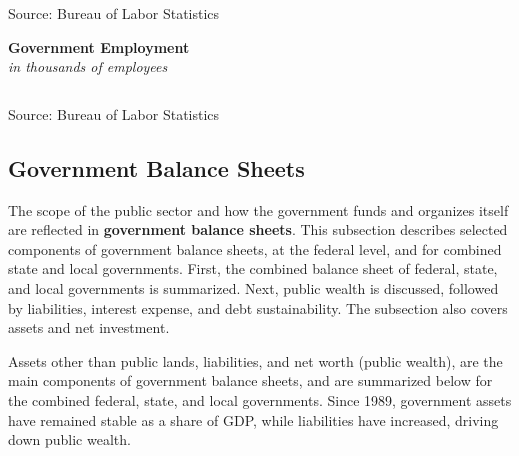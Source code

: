 \documentclass{report}
\newcommand{\tbllink}[1]{\href{https://raw.githubusercontent.com/bdecon/US-chartbook/master/chartbook/data/#1}{\faTable}}
\begin{document}
{\begin{minipage}{0.34\textwidth}
\footnotesize{Source: Bureau of Labor Statistics} \hfill \tbllink{govjobs.csv}
\end{minipage}\hspace{5mm}
\begin{minipage}{0.38\textwidth}
\small 
\end{minipage}
\vspace{3mm}

\begin{minipage}{1.0\textwidth}
\normalsize \textbf{Government Employment}\\
\footnotesize{\textit{in thousands of employees}}
\vspace*{-5mm}

 \setlength{\tabcolsep}{2.8pt} \color{black!90}
	{\renewcommand{\arraystretch}{1.52}
		\begin{tabular}{p{32mm} R{12mm} R{12mm} R{12mm} R{12mm} R{12mm} R{12mm}}
			  \hline
		\end{tabular}}
\vspace*{-2mm}
		
\footnotesize{Source: Bureau of Labor Statistics}
\end{minipage}
\newpage
\vspace*{-10mm}

\hypertarget{govbs}{\label{govbs}}
\begin{minipage}{1.0\textwidth}
\subsection*{Government Balance Sheets}   

\small The scope of the public sector and how the government funds and organizes itself are reflected in \textbf{government balance sheets}. This subsection describes selected components of government balance sheets, at the federal level, and for combined state and local governments. First, the combined balance sheet of federal, state, and local governments is summarized. Next, public wealth is discussed, followed by liabilities, interest expense, and debt sustainability. The subsection also covers assets and net investment. 

Assets other than public lands, liabilities, and net worth (public wealth), are the main components of government balance sheets, and are summarized below for the combined federal, state, and local governments. Since 1989, government assets have remained stable as a share of GDP, while liabilities have increased, driving down public wealth. 
\end{minipage}
\vspace{0.5mm}

}
\end{document}
